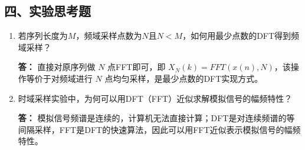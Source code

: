 \subsection{四、实验思考题}
\begin{enumerate}
    \item 若序列长度为$M$，频域采样点数为$N$且$N<M$，如何用最少点数的DFT得到频域采样？
    
    \textbf{答：} 直接对原序列做 $N$ 点FFT即可，即 $X_N(k) = FFT(x(n),N)$，该操作等价于对频域进行 $N$ 点均匀采样，是最少点数的DFT实现方式。
    
    \item 时域采样实验中，为何可以用DFT（FFT）近似求解模拟信号的幅频特性？
    
    \textbf{答：} 模拟信号频谱是连续的，计算机无法直接计算；DFT是对连续频谱的等间隔采样，FFT是DFT的快速算法，因此可以用FFT近似表示模拟信号的幅频特性。
\end{enumerate}